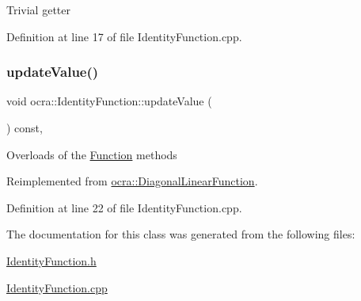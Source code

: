 Trivial getter 

Definition at line 17 of file Identity\+Function.\+cpp.

\hypertarget{classocra_1_1IdentityFunction_afd77529674b7b6db3db2542aaeedbb16}{}\label{classocra_1_1IdentityFunction_afd77529674b7b6db3db2542aaeedbb16} 
\subsubsection{\texorpdfstring{update\+Value()}{updateValue()}}
{\footnotesize\ttfamily void ocra\+::\+Identity\+Function\+::update\+Value (\begin{DoxyParamCaption}{ }\end{DoxyParamCaption}) const\hspace{0.3cm}{\ttfamily [protected]}, {\ttfamily [virtual]}}

Overloads of the \hyperlink{classocra_1_1Function}{Function} methods 

Reimplemented from \hyperlink{classocra_1_1DiagonalLinearFunction_a69523347749429dae6ae041326e40d43}{ocra\+::\+Diagonal\+Linear\+Function}.



Definition at line 22 of file Identity\+Function.\+cpp.



The documentation for this class was generated from the following files\+:\begin{DoxyCompactItemize}
\item 
\hyperlink{IdentityFunction_8h}{Identity\+Function.\+h}\item 
\hyperlink{IdentityFunction_8cpp}{Identity\+Function.\+cpp}\end{DoxyCompactItemize}
